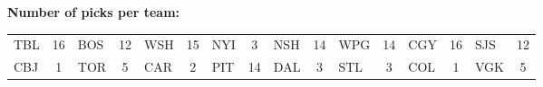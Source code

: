 \documentclass[10pt]{article}
\begin{document}
\begin{minipage}[t!]{15cm}
    \vspace{-3.5cm}
    {\bf Number of picks per team:}\\
    \begin{tabular}{lc | lc | lc | lc | lc | lc | lc | lc }
        TBL & 16 & BOS & 12 & WSH & 15 & NYI & 3 & NSH & 14 & WPG & 14 & CGY & 16 & SJS & 12 \\
        CBJ & 1 & TOR & 5 & CAR & 2 & PIT & 14 & DAL & 3 & STL & 3 & COL & 1 & VGK & 5 \\
    \end{tabular}
\end{minipage}
\end{document}
